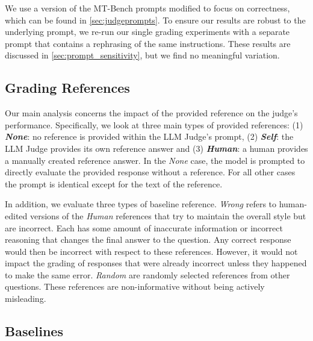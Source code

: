\documentclass{article}
\begin{document}
We use a version of the MT-Bench prompts modified to focus on correctness, which can be found in \cref{sec:judgeprompts}. To ensure our results are robust to the underlying prompt, we re-run our single grading experiments with a separate prompt that contains a rephrasing of the same instructions. These results are discussed in \cref{sec:prompt_sensitivity}, but we find no meaningful variation.

\subsection{Grading References}

Our main analysis concerns the impact of the provided reference on the judge's performance. Specifically, we look at three main types of provided references: (1) \textbf{\textit{None}}: no reference is provided within the LLM Judge's prompt, (2) \textbf{\textit{Self}}: the LLM Judge provides its own reference answer and (3) \textbf{\textit{Human}}: a human provides a manually created reference answer. In the \textit{None} case, the model is prompted to directly evaluate the provided response without a reference. For all other cases the prompt is identical except for the text of the reference.


In addition, we evaluate three types of baseline reference. \textit{Wrong} refers to human-edited versions of the \textit{Human} references that try to maintain the overall style but are incorrect. Each has some amount of inaccurate information or incorrect reasoning that changes the final answer to the question. Any correct response would then be incorrect with respect to these references. However, it would not impact the grading of responses that were already incorrect unless they happened to make the same error. \textit{Random} are randomly selected references from other questions. These references are non-informative without being actively misleading.

\subsection{Baselines}
\end{document}

